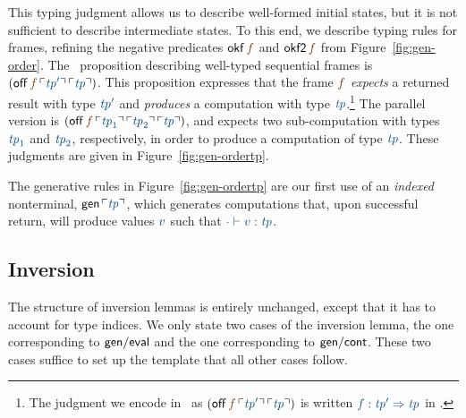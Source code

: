 This typing judgment allows us to describe well-formed initial states,
but it is not sufficient to describe intermediate states. To this end,
we describe typing rules for frames, refining the negative predicates
${\sf okf}\,\lf{f}$ and ${\sf okf2}\,\lf{f}$ from
Figure~\ref{fig:gen-order}. The \sls~proposition describing well-typed
sequential frames is $({\sf off}\,\lf{f}\,\interp{{\it
    tp}'}\,\interp{\it tp})$. This proposition expresses that the frame
$\lf{f}$ {\it expects} a returned result with type $\obj{\it tp'}$ and
{\it produces} a computation with type $\obj{{\it tp}}$.\footnote{The
  judgment we encode in \sls~as $({\sf off}\,\lf{f}\,\interp{{\it
      tp}'}\,\interp{\it tp})$ is written $\obj{f : {\it tp}'
    \Rightarrow {\it tp}}$ in \cite[Chapter 27]{harper12practical}.}
The parallel version is $({\sf off}\,\lf{f}\,\interp{{\it
    tp}_1}\,\interp{{\it tp}_2}\,\interp{\it tp})$, and expects two
sub-computation with types $\obj{{\it tp}_1}$ and $\obj{{\it tp}_2}$,
respectively, in order to produce a computation of type $\obj{{\it
    tp}}$. These judgments are given in Figure~\ref{fig:gen-ordertp}. 

The generative rules in Figure~\ref{fig:gen-ordertp} are our first use
of an {\it indexed} nonterminal, ${\sf gen}\,\interp{\it tp}$, which
generates computations that, upon successful return, will produce
values $\obj{v}$ such that $\obj{\cdot \vdash v : {\it tp}}$. 

\subsection{Inversion}

The structure of inversion lemmas is entirely unchanged, 
except that it has to account for type indices. We only state
two cases of the inversion lemma, the one corresponding to 
${\sf gen/eval}$ and the one corresponding to ${\sf gen/cont}$. 
These two cases suffice to set up the template that all other cases
follow. 

